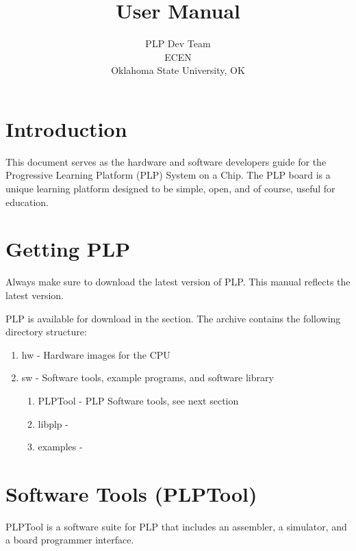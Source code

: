 \documentclass{article}
\begin{document}
\title{User Manual}
\author{PLP Dev Team\\
        ECEN \\
        Oklahoma State University, OK}
        
\maketitle
\pagebreak
\tableofcontents

\section{Introduction}
This document serves as the hardware and software developers guide for the 
Progressive Learning Platform (PLP) System on a Chip. The PLP board is a 
unique learning platform designed to be simple, open, and of course, useful 
for education. 
\section{Getting PLP}
Always make sure to download the latest version of PLP. This manual 
reflects the latest version.

PLP is available for download in the 
section. The archive contains the following directory structure:

\begin{enumerate}
\item hw - Hardware images for the CPU
\item sw - Software tools, example programs, and software library
	\begin{enumerate}
	\item PLPTool - PLP Software tools, see next section
	\item libplp - 
	\item examples - 
	\end{enumerate} 
\end{enumerate} 

\section{Software Tools (PLPTool)}
PLPTool is a software suite for PLP that includes an assembler, a simulator, 
and a board programmer interface. 
\end{document}
